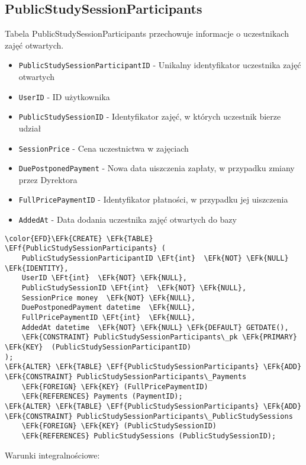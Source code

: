 \documentclass[11pt]{article}
\newcommand{\EFk}[1]{\textcolor{EFk}{\textbf{#1}}} %
\newcommand{\EFf}[1]{\textcolor{EFf}{#1}} %
\newcommand{\EFt}[1]{\textcolor{EFt}{\textbf{#1}}} %
\begin{document}
\subsection{PublicStudySessionParticipants}
\label{sec:orgbbc4066}
Tabela PublicStudySessionParticipants przechowuje informacje o uczestnikach zajęć otwartych.
\begin{itemize}
\item \texttt{PublicStudySessionParticipantID} - Unikalny identyfikator uczestnika zajęć otwartych
\item \texttt{UserID} - ID użytkownika
\item \texttt{PublicStudySessionID} - Identyfikator zajęć, w których uczestnik bierze udział
\item \texttt{SessionPrice} - Cena uczestnictwa w zajęciach
\item \texttt{DuePostponedPayment} - Nowa data uiszczenia zapłaty, w przypadku zmiany przez Dyrektora
\item \texttt{FullPricePaymentID} - Identyfikator płatności, w przypadku jej uiszczenia
\item \texttt{AddedAt} - Data dodania uczestnika zajęć otwartych do bazy
\end{itemize}
\begin{Code}
\begin{Verbatim}
\color{EFD}\EFk{CREATE} \EFk{TABLE} \EFf{PublicStudySessionParticipants} (
    PublicStudySessionParticipantID \EFt{int}  \EFk{NOT} \EFk{NULL} \EFk{IDENTITY},
    UserID \EFt{int}  \EFk{NOT} \EFk{NULL},
    PublicStudySessionID \EFt{int}  \EFk{NOT} \EFk{NULL},
    SessionPrice money  \EFk{NOT} \EFk{NULL},
    DuePostponedPayment datetime  \EFk{NULL},
    FullPricePaymentID \EFt{int}  \EFk{NULL},
    AddedAt datetime  \EFk{NOT} \EFk{NULL} \EFk{DEFAULT} GETDATE(),
    \EFk{CONSTRAINT} PublicStudySessionParticipants\_pk \EFk{PRIMARY} \EFk{KEY}  (PublicStudySessionParticipantID)
);
\EFk{ALTER} \EFk{TABLE} \EFf{PublicStudySessionParticipants} \EFk{ADD} \EFk{CONSTRAINT} PublicStudySessionParticipants\_Payments
    \EFk{FOREIGN} \EFk{KEY} (FullPricePaymentID)
    \EFk{REFERENCES} Payments (PaymentID);
\EFk{ALTER} \EFk{TABLE} \EFf{PublicStudySessionParticipants} \EFk{ADD} \EFk{CONSTRAINT} PublicStudySessionParticipants\_PublicStudySessions
    \EFk{FOREIGN} \EFk{KEY} (PublicStudySessionID)
    \EFk{REFERENCES} PublicStudySessions (PublicStudySessionID);
\end{Verbatim}
\end{Code}
Warunki integralnościowe:
\end{document}
